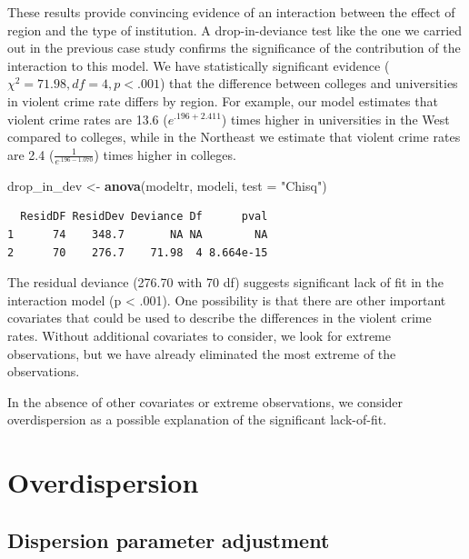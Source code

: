 \documentclass[
]{krantz}
\newenvironment{Shaded}{\begin{snugshade}}{\end{snugshade}}
\newcommand{\DataTypeTok}[1]{\textcolor[rgb]{0.27,0.27,0.27}{#1}}
\newcommand{\KeywordTok}[1]{\textcolor[rgb]{0.27,0.27,0.27}{\textbf{#1}}}
\newcommand{\NormalTok}[1]{#1}
\newcommand{\StringTok}[1]{\textcolor[rgb]{0.5,0.5,0.5}{#1}}
\begin{document}
These results provide convincing evidence of an interaction between the effect of region and the type of institution. A drop-in-deviance test like the one we carried out in the previous case study confirms the significance of the contribution of the interaction to this model. We have statistically significant evidence (\(\chi^2=71.98, df=4, p<.001\)) that the difference between colleges and universities in violent crime rate differs by region. For example, our model estimates that violent crime rates are 13.6 (\(e^{.196+2.411}\)) times higher in universities in the West compared to colleges, while in the Northeast we estimate that violent crime rates are 2.4 (\(\frac{1}{e^{.196-1.070}}\)) times higher in colleges.

\begin{Shaded}
\begin{Highlighting}[]
\NormalTok{drop_in_dev <-}\StringTok{ }\KeywordTok{anova}\NormalTok{(modeltr, modeli, }\DataTypeTok{test =} \StringTok{"Chisq"}\NormalTok{)}
\end{Highlighting}
\end{Shaded}

\begin{verbatim}
  ResidDF ResidDev Deviance Df      pval
1      74    348.7       NA NA        NA
2      70    276.7    71.98  4 8.664e-15
\end{verbatim}

The residual deviance (276.70 with 70 df) suggests significant lack of fit in the interaction model (p \textless{} .001). One possibility is that there are other important covariates that could be used to describe the differences in the violent crime rates. Without additional covariates to consider, we look for extreme observations, but we have already eliminated the most extreme of the observations.

In the absence of other covariates or extreme observations, we consider overdispersion as a possible explanation of the significant lack-of-fit.

\hypertarget{sec-overdispPois}{%
\section{Overdispersion}\label{sec-overdispPois}}

\hypertarget{dispersion-parameter-adjustment}{%
\subsection{Dispersion parameter adjustment}\label{dispersion-parameter-adjustment}}
\end{document}
